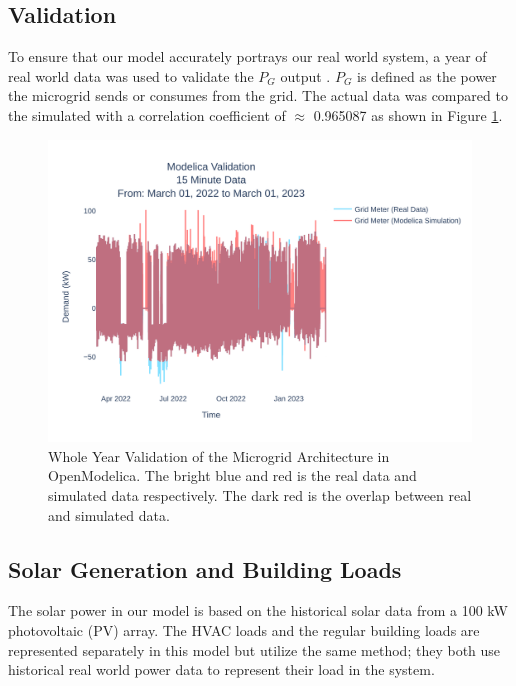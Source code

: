 \documentclass[conference]{IEEEtran}
\begin{document}
	\subsection{Validation}
		To ensure that our model accurately portrays our real world system, a year of real world data was used to validate the $P_G $ output . $P_G$ is defined as the power the microgrid sends or consumes from the grid.  The actual data was compared to the simulated  with a correlation coefficient of  $\approx$ 0.965087 as shown in Figure \ref{fig:ucr15minutedatamar012022tomar012023}. 
		\begin{figure}
			\centering
			\includegraphics[width=0.9\linewidth]{Fig/ucr_15_Minute_Data_Mar_01_2022_to_Mar_01_2023}
			\caption{\footnotesize Whole Year Validation of the Microgrid Architecture in OpenModelica. The bright blue and red is the real data and simulated data respectively. The dark red is the overlap between real and simulated data.} %
			\label{fig:ucr15minutedatamar012022tomar012023}
		\end{figure}
    \subsection{Solar Generation and Building Loads}
    	The solar power in our model is based on the historical solar data from a 100 kW  photovoltaic (PV) array. The HVAC loads and the regular building loads are represented separately in this model but utilize the same method; they both use historical real world power data to represent their load in the system. 
\end{document}
